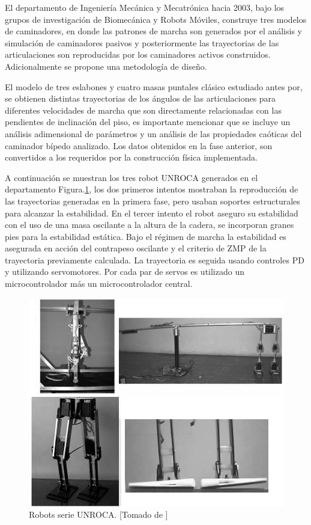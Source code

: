 \documentclass[12pt,twoside,onecolumn,letterpaper]{article}
\begin{document}
El departamento de Ingenier\'ia Mec\'anica y Mecatr\'onica hacia 2003, bajo los grupos de investigaci\'on de Biomec\'anica y Robots M\'oviles, construye tres modelos de caminadores, en donde las patrones de marcha son generados por el an\'alisis y simulaci\'on de caminadores pasivos y posteriormente las trayectorias de las articulaciones son reproducidas por los caminadores activos construidos. Adicionalmente se propone una metodolog\'ia de dise\~no\cite{Heredia2007}.\par
El modelo de tres eslabones y cuatro masas puntales cl\'asico estudiado antes por\cite{McGeer1990a}, se obtienen distintas trayectorias de los \'angulos de las articulaciones para diferentes velocidades de marcha que son directamente relacionadas con las pendientes de inclinaci\'on del piso\cite{M2005}, es importante mencionar que se incluye un an\'alisis adimensional de parámetros y un an\'alisis de las propiedades ca\'oticas del caminador bípedo analizado\cite{M2005a}. Los datos obtenidos en la fase anterior, son convertidos a los requeridos por la construcci\'on f\'isica implementada.\par
A continuaci\'on se muestran los tres robot UNROCA generados en el departamento Figura.\ref{fig:unroca}, los dos primeros intentos mostraban la reproducci\'on de las trayectorias generadas en la primera fase, pero usaban soportes estructurales para alcanzar la estabilidad. En el tercer intento el robot aseguro su estabilidad con el uso de una masa oscilante a la altura de la cadera, se incorporan granes pies para la estabilidad est\'atica. Bajo el r\'egimen de marcha la estabilidad es asegurada en acci\'on del contrapeso oscilante y el criterio de ZMP de la trayectoria previamente calculada. La trayectoria es seguida usando controles PD y utilizando servomotores. Por cada par de servos es utilizado un microcontrolador m\'as un microcontrolador central\cite{M2005}.
\begin{figure}[!hbt]
  \centering
  \includegraphics[scale=0.4]{../images/unroca.png}
  \caption{Robots serie UNROCA. [Tomado de \cite{M2005}]}
  \label{fig:unroca}
\end{figure}
\end{document}
